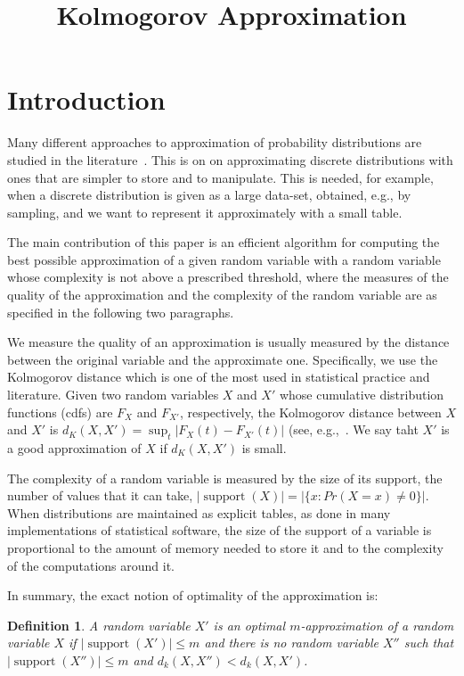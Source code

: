 \documentclass{article}
\title{Kolmogorov Approximation}
\newtheorem{definition}[thm]{Definition}
\DeclareMathOperator{\support}{support}
\begin{document}

\maketitle

\section{Introduction}

Many different approaches to approximation of probability distributions are studied in the literature~\cite{AMCR83,pavlikov2016cvar,PS77}. 
This is on on approximating discrete distributions with ones that are simpler to store and to manipulate. This is needed, for example, when a discrete distribution is given as a large data-set, obtained, e.g., by sampling, and we want to represent it approximately with a small table.  

The main contribution of this paper is an efficient algorithm for computing the best possible approximation of a given random variable with a random variable whose complexity is not above a prescribed threshold, where the measures of the quality of the approximation and the complexity of the random variable are as specified in the following two paragraphs. 

We measure the quality of an approximation is usually measured by the distance between the original variable and the approximate one. Specifically, we use the Kolmogorov distance which is one of the most used in statistical practice and literature. Given two random variables $X$ and $X'$ whose cumulative distribution functions (cdfs) are $F_X$ and $F_{X'}$, respectively, the Kolmogorov distance between $X$ and $X'$ is $d_K(X,X')= \sup_t |F_X(t) - F_{X'}(t)|$ (see, e.g.,~\cite{gibbons2011nonparametric}. We say taht $X'$ is a good approximation of $X$ if $d_K(X,X')$ is small.

The complexity of a random variable is measured by the size of its support, the number of values that it can take, $|\support(X)|=|\{x\colon Pr(X=x) \neq 0\}|$. When distributions are maintained as explicit tables, as done in many implementations of statistical software, the size of the support of a variable is proportional to the amount of memory needed to store it and to the complexity of the computations around it. 

In summary, the exact notion of optimality of the approximation is:
\begin{definition}
	A random variable $X'$ is an optimal $m$-approximation of a random variable $X$ if $|\support(X')| \leq m$ and there is no random variable $X''$ such that $|\support(X'')| \leq m$ and $d_k(X,X'') < d_k(X,X')$.
\end{definition}
\end{document}
